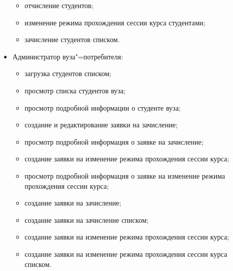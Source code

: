 \begin{itemize}
\begin{itemize}
		\item отчисление студентов;
		\item изменение режима прохождения сессии курса студентами;
		\item зачисление студентов списком.
	\end{itemize}
	\item Администратор вуза"=потребителя:
	\begin{itemize}
		\item загрузка студентов списком;
		\item просмотр списка студентов вуза;
		\item просмотр подробной информации о студенте вуза;
		\item создание и редактирование заявки на зачисление;
		\item просмотр подробной информация о заявке на зачисление;
		\item создание заявки на изменение режима прохождения сессии курса;
		\item просмотр подробной информация о заявке на изменение режима прохождения сессии курса;
		\item создание заявки на зачисление;
		\item создание заявки на зачисление списком;
		\item создание заявки на изменение режима прохождения сессии курса;
		\item создание заявки на изменение режима прохождения сессии курса списком.
	\end{itemize}
\end{itemize}



